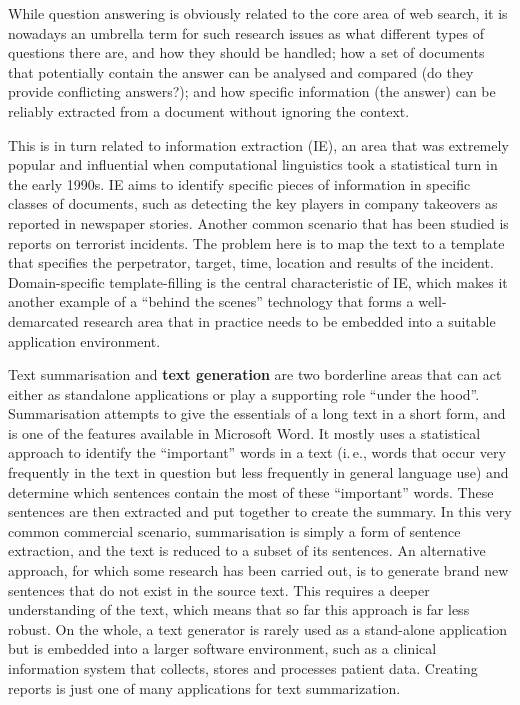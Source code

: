 \begin{multicols}{2}
While question answering is obviously related to the core area of web search, it is nowadays an umbrella term for such research issues as what different types of questions there are, and how they should be handled; how a set of documents that potentially contain the answer can be analysed and compared (do they provide conflicting answers?); and how specific information (the answer) can be reliably extracted from a document without ignoring the context. 

This is in turn related to information extraction (IE), an area that was extremely popular and influential when computational linguistics took a statistical turn in the early 1990s. IE aims to identify specific pieces of information in specific classes of documents, such as detecting the key players in company takeovers as reported in newspaper stories. Another common scenario that has been studied is reports on terrorist incidents. The problem here is to map the text to a template that specifies the perpetrator, target, time, location and results of the incident. Domain-specific template-filling is the central characteristic of IE, which makes it another example of a “behind the scenes” technology that forms a well-demarcated research area that in practice needs to be embedded into a suitable application environment. 

Text summarisation and \textbf{text generation} are two borderline areas that can act either as standalone applications or play a supporting role “under the hood”. Summarisation attempts to give the essentials of a long text in a short form, and is one of the features available in Microsoft Word. It mostly uses a statistical approach to identify the “important” words in a text (i.\,e., words that occur very frequently in the text in question but less frequently in general language use) and determine which sentences contain the most of these “important” words. These sentences are then extracted and put together to create the summary. In this very common commercial scenario, summarisation is simply a form of sentence extraction, and the text is reduced to a subset of its sentences. An alternative approach, for which some research has been carried out, is to generate brand new sentences that do not exist in the source text. This requires a deeper understanding of the text, which means that so far this approach is far less robust. On the whole, a text generator is rarely used as a stand-alone application but is embedded into a larger software environment, such as a clinical information system that collects, stores and processes patient data. Creating reports is just one of many applications for text summarization.


\end{multicols}
